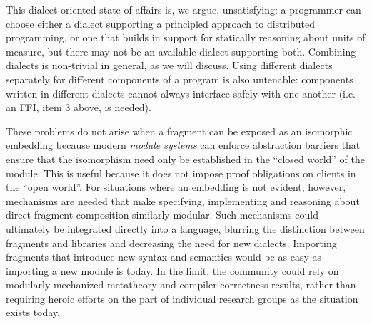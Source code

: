 \documentclass{llncs}
\begin{document}
This dialect-oriented state of affairs is, we argue, unsatisfying: a programmer can choose either a dialect supporting a principled approach to distributed programming, or one that builds in support for statically reasoning about units of measure, but there may not be an available dialect supporting both. Combining dialects is non-trivial in general, as we will discuss. Using different dialects separately for different components of a program is also untenable: components written in different dialects cannot always interface safely with one another (i.e. an FFI, item 3  above, is needed). 

These problems do not arise when a fragment can be exposed as an isomorphic embedding because modern \emph{module systems} can enforce abstraction barriers that ensure that the isomorphism need only be established in the ``closed world'' of the module. This is useful because it does not impose proof obligations on clients in the ``open world''.  %
For situations where an embedding is not evident, however, mechanisms are needed that make specifying, implementing and reasoning about direct fragment composition similarly modular. Such mechanisms could ultimately be integrated directly into a language, blurring the distinction between fragments and libraries and decreasing the need for new dialects. Importing fragments that introduce new syntax and semantics   would be as easy as importing a new module is today. In the limit, the community could rely on modularly mechanized metatheory and compiler correctness results, rather than requiring heroic efforts on the part of individual research groups as the situation exists today. %
\end{document}
